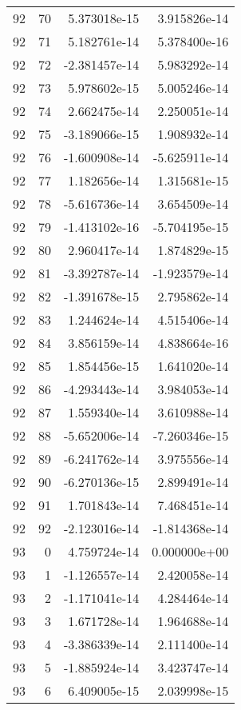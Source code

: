 \begin{tabular}{rrrr}
  92 &   70 &  5.373018e-15 &  3.915826e-14 \\
  92 &   71 &  5.182761e-14 &  5.378400e-16 \\
  92 &   72 & -2.381457e-14 &  5.983292e-14 \\
  92 &   73 &  5.978602e-15 &  5.005246e-14 \\
  92 &   74 &  2.662475e-14 &  2.250051e-14 \\
  92 &   75 & -3.189066e-15 &  1.908932e-14 \\
  92 &   76 & -1.600908e-14 & -5.625911e-14 \\
  92 &   77 &  1.182656e-14 &  1.315681e-15 \\
  92 &   78 & -5.616736e-14 &  3.654509e-14 \\
  92 &   79 & -1.413102e-16 & -5.704195e-15 \\
  92 &   80 &  2.960417e-14 &  1.874829e-15 \\
  92 &   81 & -3.392787e-14 & -1.923579e-14 \\
  92 &   82 & -1.391678e-15 &  2.795862e-14 \\
  92 &   83 &  1.244624e-14 &  4.515406e-14 \\
  92 &   84 &  3.856159e-14 &  4.838664e-16 \\
  92 &   85 &  1.854456e-15 &  1.641020e-14 \\
  92 &   86 & -4.293443e-14 &  3.984053e-14 \\
  92 &   87 &  1.559340e-14 &  3.610988e-14 \\
  92 &   88 & -5.652006e-14 & -7.260346e-15 \\
  92 &   89 & -6.241762e-14 &  3.975556e-14 \\
  92 &   90 & -6.270136e-15 &  2.899491e-14 \\
  92 &   91 &  1.701843e-14 &  7.468451e-14 \\
  92 &   92 & -2.123016e-14 & -1.814368e-14 \\
  93 &    0 &  4.759724e-14 &  0.000000e+00 \\
  93 &    1 & -1.126557e-14 &  2.420058e-14 \\
  93 &    2 & -1.171041e-14 &  4.284464e-14 \\
  93 &    3 &  1.671728e-14 &  1.964688e-14 \\
  93 &    4 & -3.386339e-14 &  2.111400e-14 \\
  93 &    5 & -1.885924e-14 &  3.423747e-14 \\
  93 &    6 &  6.409005e-15 &  2.039998e-15 \\

\end{tabular}

